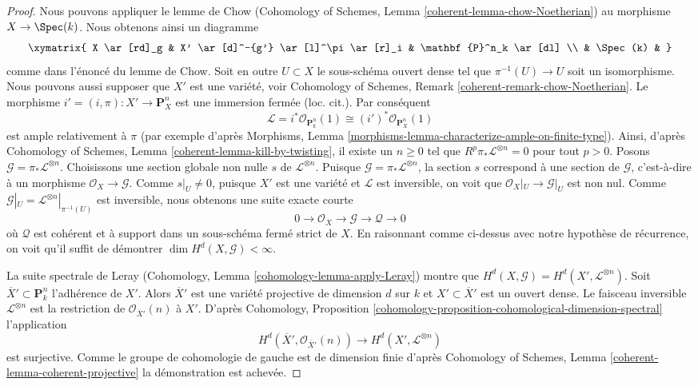 \begin{proof}
\medskip\noindent
Nous pouvons appliquer le lemme de Chow
(Cohomology of Schemes, Lemma \ref{coherent-lemma-chow-Noetherian})
au morphisme $X \to \Spec(k)$. Nous obtenons ainsi un diagramme
$$
\xymatrix{
X \ar[rd]_g & X' \ar[d]^-{g'} \ar[l]^\pi \ar[r]_i & \mathbf{P}^n_k \ar[dl] \\
& \Spec(k) &
}
$$
comme dans l'\'enonc\'e du lemme de Chow. Soit en outre $U \subset X$
le sous-sch\'ema ouvert dense tel que $\pi^{-1}(U) \to U$ soit un isomorphisme.
Nous pouvons aussi supposer que $X'$ est une vari\'et\'e, voir
Cohomology of Schemes, Remark \ref{coherent-remark-chow-Noetherian}.
Le morphisme $i' = (i, \pi) : X' \to \mathbf{P}^n_X$ est
une immersion ferm\'ee (loc. cit.). Par cons\'equent
$$
\mathcal{L} = i^*\mathcal{O}_{\mathbf{P}^n_k}(1) \cong
(i')^*\mathcal{O}_{\mathbf{P}^n_X}(1)
$$
est ample relativement \`a $\pi$ (par exemple d'apr\`es
Morphisms, Lemma \ref{morphisms-lemma-characterize-ample-on-finite-type}).
Ainsi, d'apr\`es Cohomology of Schemes, Lemma \ref{coherent-lemma-kill-by-twisting},
il existe un $n \geq 0$ tel que
$R^p\pi_*\mathcal{L}^{\otimes n} = 0$ pour tout $p > 0$.
Posons $\mathcal{G} = \pi_*\mathcal{L}^{\otimes n}$.
Choisissons une section globale non nulle $s$ de $\mathcal{L}^{\otimes n}$.
Puisque $\mathcal{G} = \pi_*\mathcal{L}^{\otimes n}$, la section $s$
correspond \`a une section de $\mathcal{G}$, c'est-\`a-dire \`a un morphisme
$\mathcal{O}_X \to \mathcal{G}$.
Comme $s|_U \not = 0$, puisque $X'$ est une vari\'et\'e et $\mathcal{L}$ est
inversible, on voit que $\mathcal{O}_X|_U \to \mathcal{G}|_U$
est non nul. Comme $\mathcal{G}|_U = \mathcal{L}^{\otimes n}|_{\pi^{-1}(U)}$
est inversible, nous obtenons une suite exacte courte
$$
0 \to \mathcal{O}_X \to \mathcal{G} \to \mathcal{Q} \to 0
$$
o\`u $\mathcal{Q}$ est coh\'erent et \`a support dans un sous-sch\'ema
ferm\'e strict de $X$. En raisonnant comme ci-dessus avec notre hypoth\`ese de
r\'ecurrence, on voit qu'il
suffit de d\'emontrer $\dim H^d(X, \mathcal{G}) < \infty$.

\medskip\noindent
La suite spectrale de Leray
(Cohomology, Lemma \ref{cohomology-lemma-apply-Leray})
montre que $H^d(X, \mathcal{G}) = H^d(X', \mathcal{L}^{\otimes n})$.
Soit $\overline{X}' \subset \mathbf{P}^n_k$ l'adh\'erence
de $X'$. Alors $\overline{X}'$ est une vari\'et\'e projective de dimension $d$
sur $k$ et $X' \subset \overline{X}'$ est un ouvert dense.
Le faisceau inversible $\mathcal{L}^{\otimes n}$ est la restriction de
$\mathcal{O}_{\overline{X}'}(n)$ \`a $X'$. D'apr\`es
Cohomology, Proposition
\ref{cohomology-proposition-cohomological-dimension-spectral}
l'application
$$
H^d(\overline{X}', \mathcal{O}_{\overline{X}'}(n))
\longrightarrow
H^d(X', \mathcal{L}^{\otimes n})
$$
est surjective. Comme le groupe de cohomologie de gauche est
de dimension finie d'apr\`es
Cohomology of Schemes, Lemma \ref{coherent-lemma-coherent-projective}
la d\'emonstration est achev\'ee.
\end{proof}

